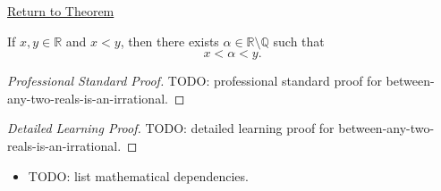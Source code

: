\newpage
{}
\label{prf:between-any-two-reals-is-an-irrational}

\begin{remark*}[Return]
\hyperref[thm:between-any-two-reals-is-an-irrational]{Return to Theorem}
\end{remark*}

\begin{theorem*}
If $x,y\in\mathbb{R}$ and $x<y$, then there exists
$\alpha\in\mathbb{R}\setminus\mathbb{Q}$ such that
\[
x<\alpha<y.
\]
\end{theorem*}

\begin{proof}[Professional Standard Proof]
\LRAProofBodyStart
TODO: professional standard proof for between-any-two-reals-is-an-irrational.
\end{proof}

\begin{proof}[Detailed Learning Proof]
\LRAProofBodyStart
TODO: detailed learning proof for between-any-two-reals-is-an-irrational.
\end{proof}

\begin{remark*}
\end{remark*}

\begin{dependencies}
\begin{itemize}
  \item TODO: list mathematical dependencies.
\end{itemize}
\end{dependencies}

\clearpage
